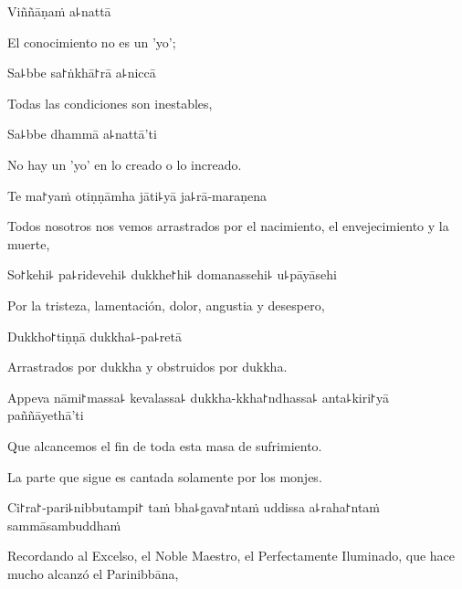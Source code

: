 Viññāṇaṁ a꜕nattā

\begin{english}
  El conocimiento no es un 'yo';
\end{english}

Sa꜕bbe sa꜓ṅkhā꜓rā a꜕niccā

\begin{english}
  Todas las condiciones son inestables,
\end{english}

Sa꜕bbe dhammā a꜕nattā'ti

\begin{english}
  No hay un 'yo' en lo creado o lo increado.
\end{english}

\clearpage

Te ma꜓yaṁ otiṇṇāmha jāti꜕yā ja꜕rā-maraṇena

\begin{english}
  Todos nosotros nos vemos arrastrados por el nacimiento, el envejecimiento y la muerte,
\end{english}

So꜓kehi꜕ pa꜕ridevehi꜕ dukkhe꜓hi꜕ domanassehi꜕ u꜕pāyāsehi

\begin{english}
  Por la tristeza, lamentación, dolor, angustia y desespero,
\end{english}

Dukkho꜓tiṇṇā dukkha꜕-pa꜕retā

\begin{english}
  Arrastrados por dukkha y obstruidos por dukkha.
\end{english}

Appeva nāmi꜓massa꜕ kevalassa꜕ dukkha-kkha꜓ndhassa꜕ anta꜕kiri꜓yā \\paññāyethā'ti

\begin{english}
  Que alcancemos el fin de toda esta masa de sufrimiento.
\end{english}

\begin{instruction}
  La parte que sigue es cantada solamente por los monjes.
\end{instruction}

Ci꜓ra꜓-pari꜕nibbutampi꜓ taṁ bha꜕gava꜓ntaṁ uddissa a꜕raha꜓ntaṁ sammāsambuddhaṁ

\begin{english}
  Recordando al Excelso, el Noble Maestro, el Perfectamente Iluminado, que hace mucho alcanzó el Parinibbāna,
\end{english}

